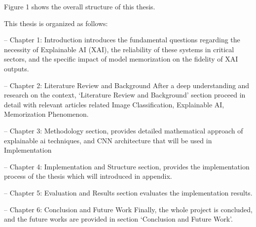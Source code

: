 Figure 1 shows the overall structure of this thesis.

This thesis is organized as follows:

– Chapter 1: Introduction introduces the fundamental questions regarding the necessity of Explainable AI (XAI), the reliability of these systems in critical sectors, and the specific impact of model memorization on the fidelity of XAI outputs.

– Chapter 2: Literature Review and Background After a deep understanding and research on the context, ‘Literature Review and Background’ section proceed in detail with relevant articles related Image Classification, Explainable AI, Memorization Phenomenon.

– Chapter 3: Methodology section, provides detailed mathematical approach of explainable ai techniques, and CNN architecture that will be used in Implementation

– Chapter 4: Implementation and Structure section, provides the implementation process of the thesis which will introduced in appendix.

– Chapter 5: Evaluation and Results section evaluates the implementation results.

– Chapter 6: Conclusion and Future Work Finally, the whole project is concluded, and the future works are provided in section ‘Conclusion and Future Work’.
